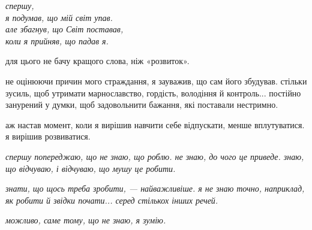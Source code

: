 \begin{flushright}
\emph{спершу,\\я подумав, що мій світ упав.\\але збагнув, що Світ поставав,\\коли я прийняв, що падав я.}
\end{flushright}

для цього не бачу кращого слова, ніж «розвиток».

не оцінюючи причин мого страждання, я зауважив, що сам його збудував. стільки зусиль, щоб утримати марнославство, гордість, володіння й контроль... постійно занурений у думки, щоб задовольнити бажання, які поставали нестримно.

аж настав момент, коли я вирішив навчити себе відпускати, менше вплутуватися. я вирішив розвиватися.

\begin{flushright}
\emph{спершу попереджаю, що не знаю, що роблю. не знаю, до чого це приведе. знаю, що відчуваю, і відчуваю, що мушу це робити.}

\emph{знати, що щось треба зробити, --- найважливіше. я не знаю точно, наприклад, як робити й звідки почати... серед стількох інших речей.}

\emph{можливо, саме тому, що не знаю, я зумію.}
\end{flushright}

